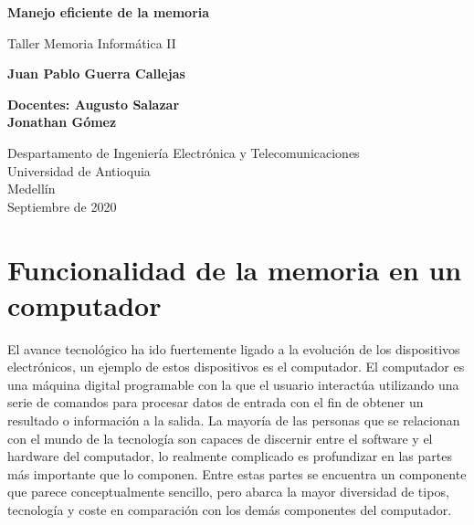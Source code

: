 \documentclass{article}
\begin{document}
\begin{titlepage}
    \begin{center}
        \vspace*{1cm}
            
        \Huge
        \textbf{Manejo eficiente de la memoria}
            
        \vspace{0.8 cm}
        \LARGE
        Taller Memoria Informática II
            
        \vspace{1.5cm}
            
        \textbf{Juan Pablo Guerra Callejas}
        
        \vspace{0.8 cm}
        
        \textbf{Docentes: Augusto Salazar\\
                Jonathan Gómez}
        \vfill
            
        \vspace{0.8cm}
            
        \Large
        Despartamento de Ingeniería Electrónica y Telecomunicaciones\\
        Universidad de Antioquia\\
        Medellín\\
        Septiembre de 2020
            
    \end{center}
\end{titlepage}

\tableofcontents
\newpage
\section{Funcionalidad de la memoria en un computador}\label{intro}


El avance tecnológico ha ido fuertemente ligado a la evolución de los dispositivos electrónicos, un ejemplo de estos dispositivos es el computador. El computador es una máquina digital programable con la que el usuario interactúa utilizando una serie de comandos para procesar datos de entrada con el fin de obtener un resultado o información a la salida. La mayoría de las personas que se relacionan con el mundo de la tecnología son capaces de discernir entre el software y el hardware del computador, lo realmente complicado es profundizar en las partes más importante que lo componen. Entre estas partes se encuentra un componente que parece conceptualmente sencillo, pero abarca la mayor diversidad de tipos, tecnología y coste en comparación con los demás componentes del computador. \\
\end{document}
